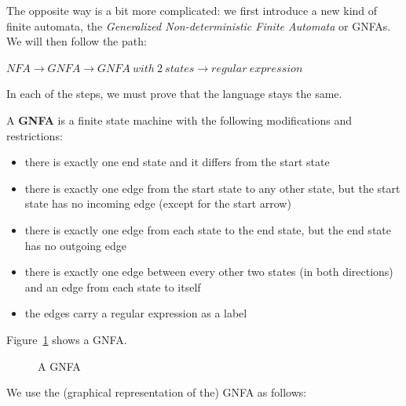 The opposite way is a bit more complicated: we first introduce a new
kind of finite automata, the {\em Generalized Non-deterministic Finite
Automata} or GNFAs. We will then follow the path:


$NFA \rightarrow GNFA \rightarrow GNFA~with~2~states \rightarrow regular~expression$

In each of the steps, we must prove that the language stays the same.

\begin{definition}
A {\bf GNFA} is a finite state machine with the following
modifications and restrictions:
\begin{itemize}
\item there is exactly one end state and it differs from the start state
\item there is exactly one edge from the start state to any other
state, but the start state has no incoming edge (except for the start arrow)
\item there is exactly one edge from each state to the end state, but
the end state has no outgoing edge
\item there is exactly one edge between every other two states (in both
directions) and an edge from each state to itself
\item the edges carry a regular expression as a label
\end{itemize}
\end{definition}


Figure~\ref{gfsa1} shows a GNFA.

\begin{figure}[h]
\caption{A GNFA\label{gfsa1}}
\end{figure}

We use the (graphical representation of the) GNFA as follows:

